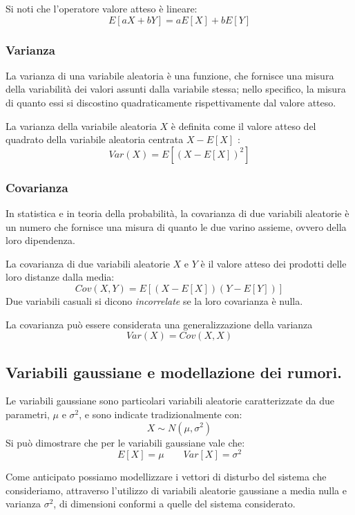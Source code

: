 \documentclass[12pt,a4paper]{article}
\begin{document}
\noindent  Si noti che l'operatore valore atteso è lineare: \[E[aX + bY] = aE[X] + bE[Y]\]




\subsubsection{Varianza}

La varianza di una variabile aleatoria è una funzione, che fornisce una misura della variabilità dei valori assunti dalla variabile stessa; nello specifico, la misura di quanto essi si discostino quadraticamente rispettivamente dal valore atteso.

La varianza della variabile aleatoria $X$ è definita come il valore atteso del quadrato della variabile aleatoria centrata $X - E[X]$ :\[Var(X) = E[(X - E[X])^2]\]

\subsubsection{Covarianza}

In statistica e in teoria della probabilità, la covarianza di due variabili aleatorie è un numero che fornisce una misura di quanto le due varino assieme, ovvero della loro dipendenza.

La covarianza di due variabili aleatorie $X$ e $Y$ è il valore atteso dei prodotti delle loro distanze dalla media: \[Cov(X,Y)= E [(X-E[X])(Y-E[Y])]\]
Due variabili casuali si dicono \textit{incorrelate} se la loro covarianza è nulla.

La covarianza può essere considerata una generalizzazione della varianza \[Var(X) = Cov(X,X)\]

\subsection{Variabili gaussiane e modellazione dei rumori.}

Le variabili gaussiane sono particolari variabili aleatorie caratterizzate da due parametri, $\mu$ e $\sigma^2$, e sono indicate tradizionalmente con: \[X \sim N(\mu ,\sigma^2)\]
Si può dimostrare che per le variabili gaussiane vale che: \[E[X]= \mu \qquad Var[X]= \sigma^2\]

Come anticipato possiamo modellizzare i vettori di disturbo del sistema che consideriamo, attraverso l'utilizzo di variabili aleatorie gaussiane a media nulla e varianza $\sigma^2$, di dimensioni conformi a quelle del sistema considerato.
\end{document}
